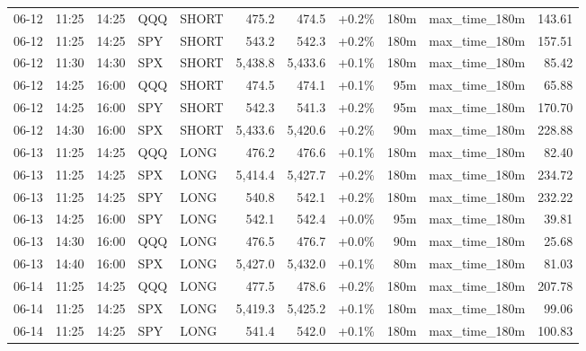 \documentclass[11pt,a4paper,twoside]{article}
\begin{document}
\begin{center}
\begin{longtable}{>{\color{txtmain}}l l l l l r r r r >{\color{txtmain}}l r}
06-12 & 11:25 & 14:25 & QQQ & SHORT & 475.2 & 474.5 & \textcolor{wingreen}{+0.2\%} & 180m & max\_time\_180m & \textcolor{wingreen}{143.61} \\
06-12 & 11:25 & 14:25 & SPY & SHORT & 543.2 & 542.3 & \textcolor{wingreen}{+0.2\%} & 180m & max\_time\_180m & \textcolor{wingreen}{157.51} \\
06-12 & 11:30 & 14:30 & SPX & SHORT & 5,438.8 & 5,433.6 & \textcolor{wingreen}{+0.1\%} & 180m & max\_time\_180m & \textcolor{wingreen}{85.42} \\
06-12 & 14:25 & 16:00 & QQQ & SHORT & 474.5 & 474.1 & \textcolor{wingreen}{+0.1\%} & 95m & max\_time\_180m & \textcolor{wingreen}{65.88} \\
06-12 & 14:25 & 16:00 & SPY & SHORT & 542.3 & 541.3 & \textcolor{wingreen}{+0.2\%} & 95m & max\_time\_180m & \textcolor{wingreen}{170.70} \\
06-12 & 14:30 & 16:00 & SPX & SHORT & 5,433.6 & 5,420.6 & \textcolor{wingreen}{+0.2\%} & 90m & max\_time\_180m & \textcolor{wingreen}{228.88} \\
06-13 & 11:25 & 14:25 & QQQ & LONG & 476.2 & 476.6 & \textcolor{wingreen}{+0.1\%} & 180m & max\_time\_180m & \textcolor{wingreen}{82.40} \\
06-13 & 11:25 & 14:25 & SPX & LONG & 5,414.4 & 5,427.7 & \textcolor{wingreen}{+0.2\%} & 180m & max\_time\_180m & \textcolor{wingreen}{234.72} \\
06-13 & 11:25 & 14:25 & SPY & LONG & 540.8 & 542.1 & \textcolor{wingreen}{+0.2\%} & 180m & max\_time\_180m & \textcolor{wingreen}{232.22} \\
06-13 & 14:25 & 16:00 & SPY & LONG & 542.1 & 542.4 & \textcolor{wingreen}{+0.0\%} & 95m & max\_time\_180m & \textcolor{wingreen}{39.81} \\
06-13 & 14:30 & 16:00 & QQQ & LONG & 476.5 & 476.7 & \textcolor{wingreen}{+0.0\%} & 90m & max\_time\_180m & \textcolor{wingreen}{25.68} \\
06-13 & 14:40 & 16:00 & SPX & LONG & 5,427.0 & 5,432.0 & \textcolor{wingreen}{+0.1\%} & 80m & max\_time\_180m & \textcolor{wingreen}{81.03} \\
06-14 & 11:25 & 14:25 & QQQ & LONG & 477.5 & 478.6 & \textcolor{wingreen}{+0.2\%} & 180m & max\_time\_180m & \textcolor{wingreen}{207.78} \\
06-14 & 11:25 & 14:25 & SPX & LONG & 5,419.3 & 5,425.2 & \textcolor{wingreen}{+0.1\%} & 180m & max\_time\_180m & \textcolor{wingreen}{99.06} \\
06-14 & 11:25 & 14:25 & SPY & LONG & 541.4 & 542.0 & \textcolor{wingreen}{+0.1\%} & 180m & max\_time\_180m & \textcolor{wingreen}{100.83} \\

\end{longtable}
\end{center}
\end{document}
